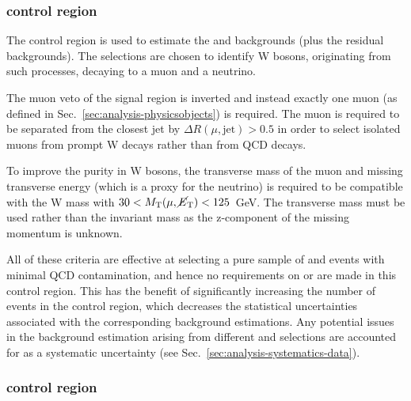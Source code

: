 

\subsubsection{\mj control region}

The \mj control region is used to estimate the \wlj and \ttbar backgrounds 
(plus the residual backgrounds).
The selections are chosen to identify W bosons, originating from such 
processes, decaying to a muon and a neutrino. 

The muon veto of the signal 
region is inverted and instead exactly one muon (as defined in 
Sec.~\ref{sec:analysis-physicsobjects}) is required. The muon is required to be 
separated from the closest jet by $\Delta R(\mu,\mathrm{jet}) > 0.5$ in order 
to select isolated muons from prompt W decays rather than from QCD decays.

To 
improve the purity in W bosons, the transverse mass of the muon and missing 
transverse energy (which 
is a proxy for the neutrino) is required to be compatible with the W mass with 
$30 < M_{\mathrm{T}}(\mu,\mbox{$\cancel{E}_\text{T}$}) < 125$~GeV. The transverse mass must be used 
rather than the invariant mass as the 
z-component of the missing momentum is unknown.

All of these 
criteria are effective at selecting a pure sample of \wlj and \ttbar events 
with minimal QCD contamination, and hence no requirements on \alphat or \bdphi 
are made in this control region. This has the benefit of significantly 
increasing the number of events in the control region, which decreases the 
statistical uncertainties associated with the corresponding background 
estimations. Any potential issues in the background estimation arising from 
different \alphat and \bdphi selections are accounted for as a systematic 
uncertainty (see Sec.~\ref{sec:analysis-systematics-data}).

\subsubsection{\mmj control region}

